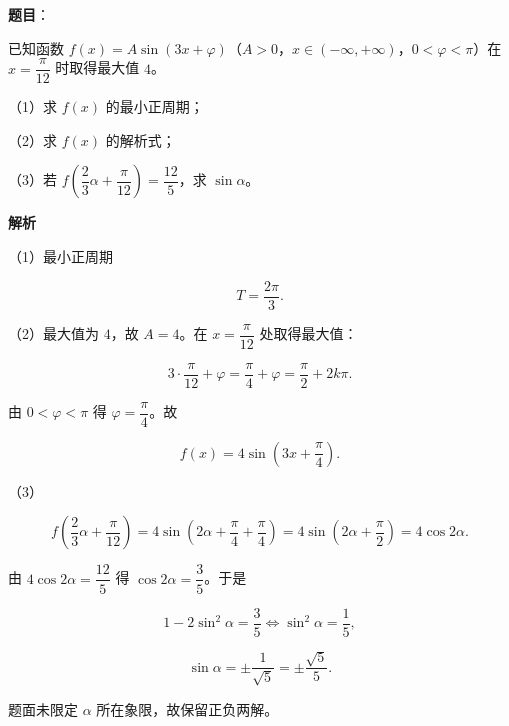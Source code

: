 \begin{answer}

\textbf{题目}：

已知函数 $f(x)=A\sin(3x+\varphi)$（$A>0$，$x\in(-\infty,+\infty)$，$0<\varphi<\pi$）在 $x=\dfrac\pi{12}$ 时取得最大值 $4$。

（1）求 $f(x)$ 的最小正周期；

（2）求 $f(x)$ 的解析式；

（3）若 $f\left(\dfrac23\alpha+\dfrac\pi{12}\right)=\dfrac{12}5$，求 $\sin\alpha$。

\textbf{解析}

（1）最小正周期

\nopagebreak[4]
\[T=\frac{2\pi}3.\]

（2）最大值为 $4$，故 $A=4$。在 $x=\dfrac\pi{12}$ 处取得最大值：

\nopagebreak[4]
\[3\cdot\frac\pi{12}+\varphi=\frac\pi4+\varphi=\frac\pi2+2k\pi.\]

由 $0<\varphi<\pi$ 得 $\varphi=\dfrac\pi4$。故

\nopagebreak[4]
\[f(x)=4\sin\left(3x+\frac\pi4\right).\]

（3）

\nopagebreak[4]
\[f\left(\frac23\alpha+\frac\pi{12}\right)
=4\sin\left(2\alpha+\frac\pi4+\frac\pi4\right)
=4\sin\left(2\alpha+\frac\pi2\right)
=4\cos2\alpha.\]

由 $4\cos2\alpha=\dfrac{12}5$ 得 $\cos2\alpha=\dfrac35$。于是

\nopagebreak[4]
\[1-2\sin^2\alpha=\frac35\iff \sin^2\alpha=\frac15,\]

\nopagebreak[4]
\[\sin\alpha=\pm\frac1{\sqrt5}=\pm\frac{\sqrt5}5.\]

题面未限定 $\alpha$ 所在象限，故保留正负两解。


\end{answer}
